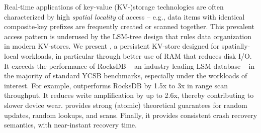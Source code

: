 Real-time applications of key-value (KV-)storage technologies are often characterized by high \emph{spatial locality}
of access -- e.g., data items with identical composite-key prefixes are frequently created or scanned together.  
This prevalent access pattern is underused by the LSM-tree design that rules data organization in modern KV-stores.
We present \sys, a persistent KV-store designed for spatially-local workloads, in particular through better use of RAM
that reduces disk I/O.  It exceeds the performance of RocksDB -- an industry-leading LSM database -- in the majority 
of standard YCSB benchmarks, especially under the workloads of interest. For example, \sys\/ outperforms RocksDB 
by 1.5x to 3x in range scan throughput. It reduces write amplification by up to 2.6x, thereby contributing to slower 
device wear. \sys\/ provides strong (atomic) theoretical guarantees for random updates, random lookups, and scans. 
Finally, it provides consistent crash recovery semantics, with near-instant recovery time. 